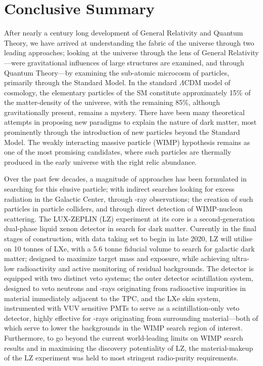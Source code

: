 \chapter{Conclusive Summary}
\label{chap:chap8}

After nearly a century long development of General Relativity and Quantum Theory, we have arrived at understanding the fabric of the universe through two leading approaches; looking at the universe through the lens of General Relativity---were gravitational influences of large structures are examined, and through Quantum Theory---by examining the sub-atomic microcosm of particles, primarily through the Standard Model. In the standard $\Lambda$CDM model of cosmology, the elementary particles of the SM constitute approximately 15\% of the matter-density of the universe, with the remaining 85\%, although gravitationally present, remains a mystery. There have been many theoretical attempts in proposing new paradigms to explain the nature of dark matter, most prominently through the introduction of new particles beyond the Standard Model. The weakly interacting massive particle (WIMP) hypothesis remains as one of the most promising candidates, where such particles are thermally produced in the early universe with the right relic abundance. 

Over the past few decades, a magnitude of approaches has been formulated in  searching for this elusive particle; with indirect searches looking for excess radiation in the Galactic Center, through \gamma-ray observations; the creation of such particles in particle colliders, and through direct detection of WIMP-nucleon scattering. The LUX-ZEPLIN (LZ) experiment at its core is a second-generation dual-phase liquid xenon detector in search for dark matter. Currently in the final stages of construction, with data taking set to begin in late 2020, LZ will utilise on 10 tonnes of LXe, with a 5.6 tonne fiducial volume to search for galactic dark matter; designed to maximize target mass and exposure, while achieving ultra-low radioactivity and active monitoring of residual backgrounds. The detector is equipped with two distinct veto systems; the outer detector scintillation system, designed to veto neutrons and \gamma{}-rays originating from radioactive impurities in material immediately adjacent to the TPC, and the LXe skin system, instrumented with VUV sensitive PMTs to serve as a scintillation-only veto detector, highly effective for \gamma{}-rays originating from surrounding material---both of which serve to lower the backgrounds in the WIMP search region of interest. Furthermore, to go beyond the current world-leading limits on WIMP search results and in maximising the discovery potentiality of LZ, the material-makeup of the LZ experiment was held to most stringent radio-purity requirements. 

